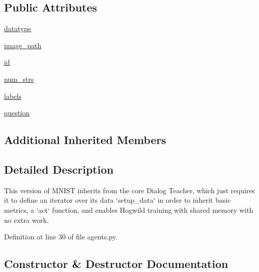 \subsection*{Public Attributes}
\begin{DoxyCompactItemize}
\item 
\hyperlink{classparlai_1_1tasks_1_1mnist__qa_1_1agents_1_1MnistQATeacher_a813aa1c2a680e44e88ecb2832d99d51f}{datatype}
\item 
\hyperlink{classparlai_1_1tasks_1_1mnist__qa_1_1agents_1_1MnistQATeacher_a7c93f12d922a5f35699379983acfd5f0}{image\+\_\+path}
\item 
\hyperlink{classparlai_1_1tasks_1_1mnist__qa_1_1agents_1_1MnistQATeacher_a5f5642ab4593624e0f9a0a633deebf40}{id}
\item 
\hyperlink{classparlai_1_1tasks_1_1mnist__qa_1_1agents_1_1MnistQATeacher_aaee79511f7f1ec89e8701435e5b95036}{num\+\_\+strs}
\item 
\hyperlink{classparlai_1_1tasks_1_1mnist__qa_1_1agents_1_1MnistQATeacher_aa6621e4f56e5cdb9cb5d24bc439e2083}{labels}
\item 
\hyperlink{classparlai_1_1tasks_1_1mnist__qa_1_1agents_1_1MnistQATeacher_a79fbc5e429e1ee91b592fc6da4675c54}{question}
\end{DoxyCompactItemize}
\subsection*{Additional Inherited Members}


\subsection{Detailed Description}
\begin{DoxyVerb}This version of MNIST inherits from the core Dialog Teacher, which just
requires it to define an iterator over its data `setup_data` in order to
inherit basic metrics, a `act` function, and enables
Hogwild training with shared memory with no extra work.
\end{DoxyVerb}
 

Definition at line 30 of file agents.\+py.



\subsection{Constructor \& Destructor Documentation}
\mbox{\label{classparlai_1_1tasks_1_1mnist__qa_1_1agents_1_1MnistQATeacher_a6ef124a2cc6ff3edc13291768fafbe29}} 
